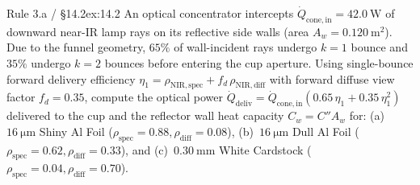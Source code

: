 \begin{devicebox}
\begin{enumerate}
\end{enumerate}
\end{devicebox}

\begin{workedexample}{Rule 3.a / §14.2}{ex:14.2}
An optical concentrator intercepts $\dot{Q}_{\mathrm{cone,in}} = \SI{42.0}{\watt}$ of downward near-IR lamp rays on its reflective side walls (area $A_w = \SI{0.120}{\square\meter}$). Due to the funnel geometry, $65\%$ of wall-incident rays undergo $k=1$ bounce and $35\%$ undergo $k=2$ bounces before entering the cup aperture. Using single-bounce forward delivery efficiency $\eta_1 = \rho_{\mathrm{NIR,spec}} + f_d\,\rho_{\mathrm{NIR,diff}}$ with forward diffuse view factor $f_d = 0.35$, compute the optical power $\dot{Q}_{\mathrm{deliv}} = \dot{Q}_{\mathrm{cone,in}}(0.65\,\eta_1 + 0.35\,\eta_1^2)$ delivered to the cup and the reflector wall heat capacity $C_w = C'' A_w$ for: (a)~$\SI{16}{\micro\meter}$ Shiny Al Foil ($\rho_{\mathrm{spec}}=0.88, \rho_{\mathrm{diff}}=0.08$), (b)~$\SI{16}{\micro\meter}$ Dull Al Foil ($\rho_{\mathrm{spec}}=0.62, \rho_{\mathrm{diff}}=0.33$), and (c)~$\SI{0.30}{\milli\meter}$ White Cardstock ($\rho_{\mathrm{spec}}=0.04, \rho_{\mathrm{diff}}=0.70$).


\end{workedexample}
